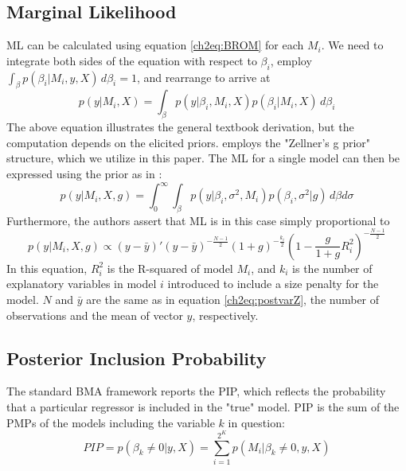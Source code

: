 \subsection{Marginal Likelihood}\label{ch2sec:ML}
\ac{ML} can be calculated using equation \ref{ch2eq:BROM} for each $M_{i}$. We need to integrate both sides of the equation with respect to $\beta_{i}$, employ $\int_{\beta} p(\beta_{i}\vert M_{i},y,X) \, d\beta_{i}=1$, and rearrange to arrive at
%
\begin{equation}\label{ch2eq:ML}
	p(y \vert  M_{i},X) = \int_{\beta}{p(y \vert \beta_{i},M_{i},X)p(\beta_{i} \vert M_{i},X) \, d\beta_{i}}
\end{equation}
The above equation illustrates the general textbook derivation, but the computation depends on the elicited priors. \citet{Zeugner2011} employs the "Zellner's g prior" structure, which we utilize in this paper. The \ac{ML} for a single model can then be expressed using the prior as in \citet{FeldkircherZeugner2009}:
\begin{equation}\label{ch2eq:MLFZ}
	p(y \vert  M_{i},X,g) = \int_{0}^{\infty}{\int_{\beta}{p(y \vert \beta_{i}, \sigma^{2},M_{i})p(\beta_{i},\sigma^{2} \vert g) \, d\beta d\sigma}}
\end{equation}
Furthermore, the authors assert that \ac{ML} is in this case simply proportional to
%
\begin{equation}\label{ch2eq:MLg}
	p(y \vert M_{i}, X, g) \propto (y-\bar{y})'(y-\bar{y})^{- \frac{N-1}{2}} (1+g)^{- \frac{k_{i}}{2}} \left(1- \frac{g}{1+g}R^{2}_{i} \right)^{- \frac{N-1}{2}}
\end{equation}
In this equation, $R^{2}_{i}$ is the R-squared of model $M_{i}$, and $k_{i}$ is the number of explanatory variables in model $i$ introduced to include a size penalty for the model. $N$ and $\bar{y}$ are the same as in equation \ref{ch2eq:postvarZ}, the number of observations and the mean of vector $y$, respectively.
\subsection{Posterior Inclusion Probability}
The standard \ac{BMA} framework reports the \ac{PIP}, which reflects the probability that a particular regressor is included in the "true" model. \ac{PIP} is the sum of the \acp{PMP} of the models including the variable $k$ in question:
\begin{equation}\label{ch2eq:PIP}
	PIP = p(\beta_{k} \neq 0 \vert y, X) = \sum_{i=1}^{2^{K}} p(M_{i} \vert \beta_{k} \neq 0, y, X)
\end{equation}
